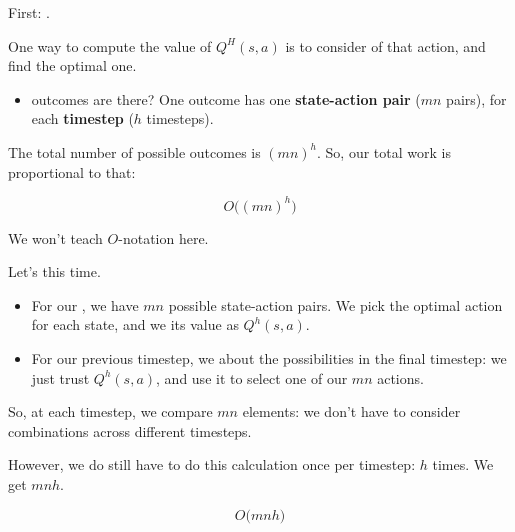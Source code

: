         \subsecdiv

        First: .

        One way to compute the value of $Q^H(s,a)$ is to consider  of that action, and find the optimal one.

        \begin{itemize}
            \item {} outcomes are there? One outcome has one \textbf{state-action pair} ($mn$ pairs), for each \textbf{timestep} ($h$ timesteps).
        \end{itemize}

        The total number of possible outcomes is $(mn)^h$. So, our total work is proportional to that:

        \begin{equation}
            O\big((mn)^h\big)
        \end{equation}

        We won't teach $O$-notation here.

        \subsecdiv

        Let's  this time.

        \begin{itemize}
            \item For our , we have $mn$ possible state-action pairs. We pick the optimal action for each state, and we  its value as $Q^h(s,a)$.
            \item For our previous timestep, we  about the possibilities in the final timestep: we just trust $Q^h(s,a)$, and use it to select one of our $mn$ actions. 
        \end{itemize}

        So, at each timestep, we compare $mn$ elements: we don't have to consider combinations across different timesteps.

        However, we do still have to do this calculation once per timestep: $h$ times. We get $mnh$.

        \begin{equation}
            O\big(mnh\big)
        \end{equation}

